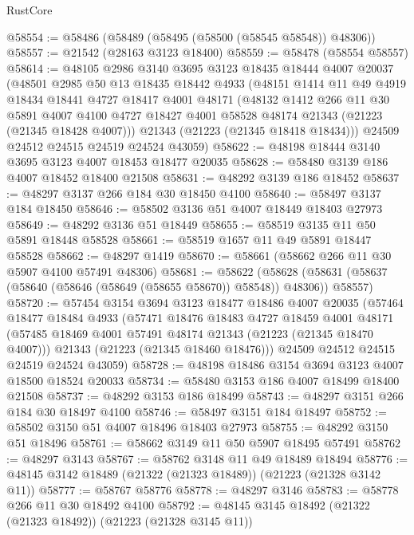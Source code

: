 \begin{lexlean}{RustCore}
\begin{coremodule}
@58554 := @58486 (@58489 (@58495 (@58500 (@58545 @58548)) @48306))
@58557 := @21542 (@28163 @3123 @18400)
@58559 := @58478 (@58554 @58557)
@58614 := @48105
    @2986
    @3140
    @3695
    @3123
    @18435
    @18444
    @4007
    @20037
    (@48501
      @2985
      @50
      @13
      @18435
      @18442
      @4933
      (@48151
        @1414
        @11
        @49
        @4919
        @18434
        @18441
        @4727
        @18417
        @4001
        @48171
        (@48132
          @1412
          @266
          @11
          @30
          @5891
          @4007
          @4100
          @4727
          @18427
          @4001
          @58528
          @48174
          @21343
          (@21223 (@21345 @18428 @4007)))
        @21343
        (@21223 (@21345 @18418 @18434)))
      @24509
      @24512
      @24515
      @24519
      @24524
      @43059)
@58622 := @48198 @18444 @3140 @3695 @3123 @4007 @18453 @18477 @20035
@58628 := @58480 @3139 @186 @4007 @18452 @18400 @21508
@58631 := @48292 @3139 @186 @18452
@58637 := @48297 @3137 @266 @184 @30 @18450 @4100
@58640 := @58497 @3137 @184 @18450
@58646 := @58502 @3136 @51 @4007 @18449 @18403 @27973
@58649 := @48292 @3136 @51 @18449
@58655 := @58519 @3135 @11 @50 @5891 @18448 @58528
@58661 := @58519 @1657 @11 @49 @5891 @18447 @58528
@58662 := @48297 @1419
@58670 := @58661 (@58662 @266 @11 @30 @5907 @4100 @57491 @48306)
@58681 := @58622
    (@58628 (@58631 (@58637 (@58640 (@58646 (@58649 (@58655 @58670)) @58548)) @48306)) @58557)
@58720 := @57454
    @3154
    @3694
    @3123
    @18477
    @18486
    @4007
    @20035
    (@57464
      @18477
      @18484
      @4933
      (@57471
        @18476
        @18483
        @4727
        @18459
        @4001
        @48171
        (@57485 @18469 @4001 @57491 @48174 @21343 (@21223 (@21345 @18470 @4007)))
        @21343
        (@21223 (@21345 @18460 @18476)))
      @24509
      @24512
      @24515
      @24519
      @24524
      @43059)
@58728 := @48198 @18486 @3154 @3694 @3123 @4007 @18500 @18524 @20033
@58734 := @58480 @3153 @186 @4007 @18499 @18400 @21508
@58737 := @48292 @3153 @186 @18499
@58743 := @48297 @3151 @266 @184 @30 @18497 @4100
@58746 := @58497 @3151 @184 @18497
@58752 := @58502 @3150 @51 @4007 @18496 @18403 @27973
@58755 := @48292 @3150 @51 @18496
@58761 := @58662 @3149 @11 @50 @5907 @18495 @57491
@58762 := @48297 @3143
@58767 := @58762 @3148 @11 @49 @18489 @18494
@58776 := @48145 @3142 @18489 (@21322 (@21323 @18489)) (@21223 (@21328 @3142 @11))
@58777 := @58767 @58776
@58778 := @48297 @3146
@58783 := @58778 @266 @11 @30 @18492 @4100
@58792 := @48145 @3145 @18492 (@21322 (@21323 @18492)) (@21223 (@21328 @3145 @11))

\end{coremodule}
\end{lexlean}
